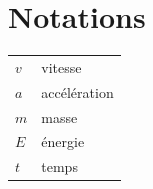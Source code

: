 \chapter*{Notations}

\begin{tabular}{ll}
$v$ & vitesse \\
$a$ & accélération \\
$m$ & masse \\
$E$ & énergie \\
$t$ & temps \\
\end{tabular}
